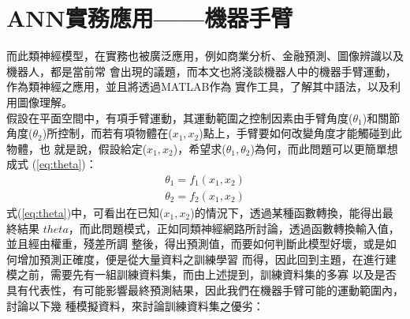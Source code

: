 	\section{ANN實務應用——機器手臂}
		而此類神經模型，在實務也被廣泛應用，例如商業分析、金融預測、圖像辨識以及機器人，都是當前常			會出現的議題，而本文也將淺談機器人中的機器手臂運動，作為類神經之應用，並且將透過MATLAB作為			實作工具，了解其中語法，以及利用圖像理解。
		\\		
		假設在平面空間中，有項手臂運動，其運動範圍之控制因素由手臂角度($\theta_1$)和關節角度($				\theta_2$)所控制，而若有項物體在($x_1,x_2$)點上，手臂要如何改變角度才能觸碰到此物體，也			就是說，假設給定($x_1,x_2$)，希望求($\theta_1,\theta_2$)為何，而此問題可以更簡單想成式			(\ref{eq:theta})：
		\begin{equation} 
            \begin{split} \label{eq:theta}
                \theta_1 = f_1(x_1,x_2)\\
                \theta_2 = f_2(x_1,x_2)
            \end{split}
        \end{equation}
        式(\ref{eq:theta})中，可看出在已知($x_1,x_2$)的情況下，透過某種函數轉換，能得出最終結果
        $theta$，而此問題模式，正如同類神經網路所討論，透過函數轉換輸入值，並且經由權重，殘差所調			整後，得出預測值，而要如何判斷此模型好壞，或是如何增加預測正確度，便是從大量資料之訓練學習			而得，因此回到主題，在進行建模之前，需要先有一組訓練資料集，而由上述提到，訓練資料集的多寡			以及是否具有代表性，有可能影響最終預測結果，因此我們在機器手臂可能的運動範圍內，討論以下幾			種模擬資料，來討論訓練資料集之優劣：
        \\
